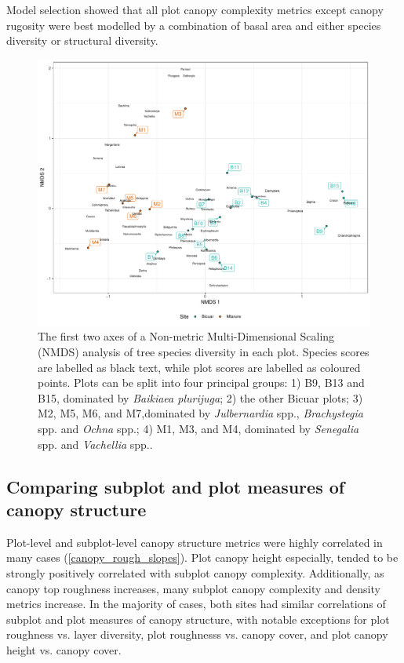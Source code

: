 \documentclass[11pt,a4paper]{article}
\begin{document}
Model selection showed that all plot canopy complexity metrics except canopy rugosity were best modelled by a combination of basal area and either species diversity or structural diversity. 

%

\begin{figure}[H]
	\includegraphics[width=\textwidth]{nmds}
	\caption{The first two axes of a Non-metric Multi-Dimensional Scaling (NMDS) analysis of tree species diversity in each plot. Species scores are labelled as black text, while plot scores are labelled as coloured points. Plots can be split into four principal groups: 1) B9, B13 and B15, dominated by \textit{Baikiaea plurijuga}; 2) the other Bicuar plots; 3) M2, M5, M6, and M7,dominated by \textit{Julbernardia} spp., \textit{Brachystegia} spp. and \textit{Ochna} spp.; 4) M1, M3, and M4, dominated by \textit{Senegalia} spp. and \textit{Vachellia} spp..}
	\label{nmds}
\end{figure}


\subsection{Comparing subplot and plot measures of canopy structure}

Plot-level and subplot-level canopy structure metrics were highly correlated in many cases (\autoref{canopy_rough_slopes}). Plot canopy height especially, tended to be strongly positively correlated with subplot canopy complexity. Additionally, as canopy top roughness increases, many subplot canopy complexity and density metrics increase. In the majority of cases, both sites had similar correlations of subplot and plot measures of canopy structure, with notable exceptions for plot roughness vs. layer diversity, plot roughnesss vs. canopy cover, and plot canopy height vs. canopy cover.
\end{document}
